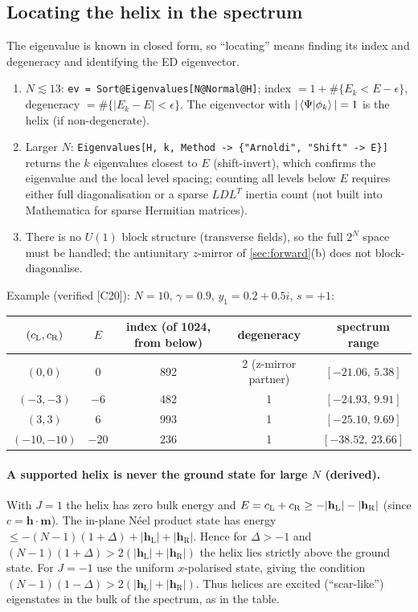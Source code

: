 \documentclass[11pt,a4paper]{article}
\theoremstyle{definition}
\newcommand{\hL}{\mathbf h_{\mathrm L}}
\newcommand{\hR}{\mathbf h_{\mathrm R}}
\newcommand{\ver}[1]{\textsf{[#1]}}   %
\begin{document}
\subsection{Locating the helix in the spectrum}
The eigenvalue is known in closed form, so ``locating'' means finding its index and degeneracy and identifying the ED eigenvector.
\begin{enumerate}[label=(\alph*)]
\item $N\lesssim13$: \texttt{ev = Sort@Eigenvalues[N@Normal@H]}; index $=1+\#\{E_k<E-\epsilon\}$, degeneracy $=\#\{|E_k-E|<\epsilon\}$. The eigenvector with $|\braket{\Psi|\phi_k}|=1$ is the helix (if non-degenerate).
\item Larger $N$: \texttt{Eigenvalues[H, k, Method -> \{"Arnoldi", "Shift" -> E\}]} returns the $k$ eigenvalues closest to $E$ (shift-invert), which confirms the eigenvalue and the local level spacing; counting all levels below $E$ requires either full diagonalisation or a sparse $LDL^{T}$ inertia count (not built into Mathematica for sparse Hermitian matrices).
\item There is no $U(1)$ block structure (transverse fields), so the full $2^N$ space must be handled; the antiunitary $z$-mirror of \cref{sec:forward}(b) does not block-diagonalise.
\end{enumerate}
Example (verified \ver{C20}): $N=10$, $\gamma=0.9$, $y_1=0.2+0.5i$, $s=+1$:
\begin{center}
\begin{tabular}{ccccc}
\toprule
$(c_{\rm L},c_{\rm R})$ & $E$ & index (of 1024, from below) & degeneracy & spectrum range\\ \midrule
$(0,0)$ & $0$ & 892 & 2 (z-mirror partner) & $[-21.06,\,5.38]$\\
$(-3,-3)$ & $-6$ & 482 & 1 & $[-24.93,\,9.91]$\\
$(3,3)$ & $6$ & 993 & 1 & $[-25.10,\,9.69]$\\
$(-10,-10)$ & $-20$ & 236 & 1 & $[-38.52,\,23.66]$\\ \bottomrule
\end{tabular}
\end{center}
\paragraph{A supported helix is never the ground state for large $N$ (derived).} With $J=1$ the helix has zero bulk energy and $E=c_{\rm L}+c_{\rm R}\ge-|\hL|-|\hR|$ (since $c=\mathbf h\cdot\mathbf m$). The in-plane N\'eel product state has energy $\le-(N-1)(1+\Delta)+|\hL|+|\hR|$. Hence for $\Delta>-1$ and $(N-1)(1+\Delta)>2(|\hL|+|\hR|)$ the helix lies strictly above the ground state. For $J=-1$ use the uniform $x$-polarised state, giving the condition $(N-1)(1-\Delta)>2(|\hL|+|\hR|)$. Thus helices are excited (``scar-like'') eigenstates in the bulk of the spectrum, as in the table.
\end{document}
